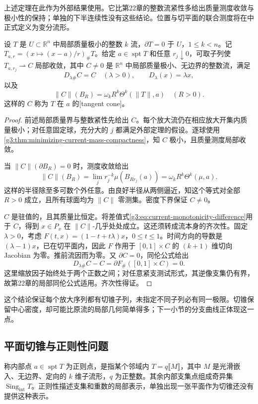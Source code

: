 上述定理在此作为外部结果使用。它比第22章的整数流紧性多给出质量测度收敛与极小性的保持；单独的下半连续性没有这些结论。位置与切平面的联合测度将在中正式定义为变分流形。

\begin{theorem}\label{g3:thm:minimizing-current-tangent-cone}
	设 \(T\) 是 \(U\subset\mathbb R^n\) 中局部质量极小的整数 \(k\) 流，\(\partial T=0\) 于 \(U\)，\(1\le k<n\)。记 \(T_{a,r}=(x\mapsto(x-a)/r)_\#T\)。给定 \(a\in\operatorname{spt}T\) 和任意 \(r_j\downarrow0\)，可取子列使 \(T_{a,r_j}\rightharpoonup C\) 局部收敛，其中 \(C\ne0\) 是 \(\mathbb R^n\) 中局部质量极小、无边界的整数流，满足
	\begin{equation}\label{g3:eq:current-tangent-cone-homogeneity}
		D_{\lambda\#}C=C\quad(\lambda>0),\qquad D_\lambda(x)=\lambda x,
	\end{equation}
	以及
	\[
		\|C\|(B_R)=\omega_kR^k\Theta^k(\|T\|,a)\quad(R>0).
	\]
	这样的 \(C\) 称为 \(T\) 在 \(a\) 的[tangent cone]。
\end{theorem}
\begin{proof}
	前述局部质量界与整数紧性先给出 \(C\)。每个放大流仍在相应放大开集内质量极小；对任意固定球，充分大的 \(j\) 都满足外部定理的假设。逐球使用\cref{g3:thm:minimizing-current-mass-compactness}，知 \(C\) 极小，且质量测度局部收敛。

	当 \(\|C\|(\partial B_R)=0\) 时，测度收敛给出
	\[
		\|C\|(B_R)
		=\lim_jr_j^{-k}\mu(B_{Rr_j}(a))
		=\omega_kR^k\Theta^k(\mu,a).
	\]
	这样的半径除至多可数个外任意。由良好半径从两侧逼近，知这个等式对全部 \(R>0\) 成立，且所有球面均为 \(\|C\|\) 零测集。密度下界保证 \(C\ne0\)。

	\(C\) 是驻值的，且其质量比恒定。将差值式\eqref{g3:eq:current-monotonicity-difference}用于 \(C\)，得到
	\(x\in P_x\) 在 \(\|C\|\)-几乎处处成立。这还须转成流本身的齐次性。固定 \(\lambda>0\)，考虑
	\(F(t,x)=(1-t+t\lambda)x\)，\(0\le t\le1\)。时间方向的导数是 \((\lambda-1)x\)，已在切平面内，因此 \(F\) 作用于 \([0,1]\times C\) 的 \((k+1)\) 维切向 Jacobian 为零。推前流因而为零。又 \(\partial C=0\)，同伦公式给出
	\[
		D_{\lambda\#}C-C
		=\partial F_\#([0,1]\times C)=0.
	\]
	这里缩放因子始终处于两个正数之间；对任意紧支测试形式，其逆像支集仍有界，故第22章的局部同伦公式适用。齐次性得证。
\end{proof}

这个结论保证每个放大序列都有切锥子列，未指定不同子列必有同一极限。切锥保留中心密度，却可能比原流的局部几何简单得多；下一小节的分支曲线正体现这一点。

\subsection{平面切锥与正则性问题}
\label{g3:subsec:2303:03}
称内部点 \(a\in\operatorname{spt}T\) 为正则点，是指某个邻域内
\(T=q\lBrack M\rBrack\)，其中 \(M\) 是光滑嵌入、无边界、定向的 \(k\) 维子流形，\(q\) 为正整数。其余内部支集点组成奇异集 \(\operatorname{Sing}_{\mathrm{int}}T\)。正则性描述支集和重数的局部表示，单独出现一张平面作为切锥还没有提供这种表示。

